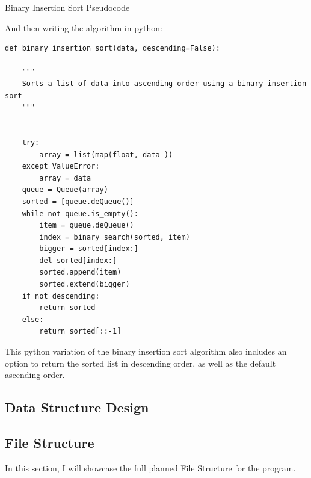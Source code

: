 \documentclass{article}
\begin{document}
\begin{algorithm}[ht]
    \caption{Binary Insertion Sort Pseudocode}
    \begin{algorithmic} [1]
            \EndWhile
        \EndFunction
    \end{algorithmic}
\end{algorithm}

And then writing the algorithm in python:

\begin{lstlisting}
def binary_insertion_sort(data, descending=False):

    """
    Sorts a list of data into ascending order using a binary insertion sort
    """


    try:
        array = list(map(float, data ))
    except ValueError:
        array = data
    queue = Queue(array)
    sorted = [queue.deQueue()]
    while not queue.is_empty():
        item = queue.deQueue()
        index = binary_search(sorted, item)
        bigger = sorted[index:]
        del sorted[index:]
        sorted.append(item)
        sorted.extend(bigger)
    if not descending:
        return sorted
    else:
        return sorted[::-1]
\end{lstlisting}

This python variation of the binary insertion sort algorithm also includes an option to return the sorted list in descending order, as well as the default ascending order.
\subsection{Data Structure Design}

\clearpage

\subsection{File Structure}

In this section, I will showcase the full planned File Structure for the program.
\end{document}

